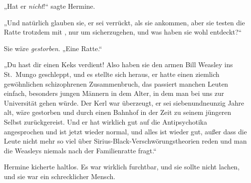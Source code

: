 „Hat er \emph{nicht}!“ sagte Hermine.

„Und natürlich glauben sie, er sei verrückt, als sie ankommen, aber sie testen die Ratte trotzdem mit , nur um sicherzugehen, und was haben sie wohl entdeckt?“%

Sie wäre \emph{gestorben}.
„Eine Ratte.“

„Du hast dir einen Keks verdient! Also haben sie den armen Bill Weasley ins St.~Mungo geschleppt, und es stellte sich heraus, er hatte einen ziemlich gewöhnlichen schizophrenen Zusammenbruch, das passiert manchen Leuten einfach, besonders jungen Männern in dem Alter, in dem man bei uns zur Universität gehen würde. Der Kerl war überzeugt, er sei siebenundneunzig Jahre alt, wäre gestorben und durch einen Bahnhof in der Zeit zu seinem jüngeren Selbst zurückgereist. Und er hat wirklich gut auf die Antipsychotika angesprochen und ist jetzt wieder normal, und alles ist wieder gut, außer dass die Leute nicht mehr so viel über Sirius-Black-Verschwörungstheorien reden und man die Weasleys niemals nach der Familienratte fragt.“

Hermine kicherte haltlos. Es war wirklich furchtbar, und sie sollte nicht lachen, und sie war ein schrecklicher Mensch.

